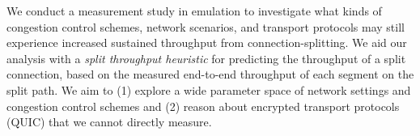 
We conduct a measurement study in emulation to investigate what kinds of
congestion control schemes, network scenarios, and transport protocols may
still experience increased sustained throughput from connection-splitting. We
aid our analysis with a \textit{split throughput heuristic} for predicting the
throughput of a split
connection, based on the measured end-to-end throughput of each segment on the
split path. We aim to (1) explore a wide parameter space of network settings
and congestion control schemes and (2) reason about encrypted transport
protocols (QUIC) that we cannot directly measure.




